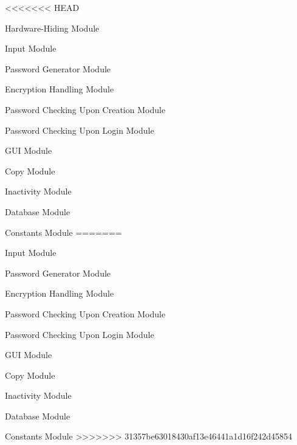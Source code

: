 \documentclass[12pt, titlepage]{article}
\newcounter{mnum}
\newcommand{\mthemnum}{M\themnum}
\begin{document}
\begin{description}
<<<<<<< HEAD
\item [\refstepcounter{mnum} \mthemnum \label{mHH}:] Hardware-Hiding Module  
\item [\refstepcounter{mnum} \mthemnum \label{mIn}:] Input Module
\item [\refstepcounter{mnum} \mthemnum \label{mPG}:] Password Generator Module
\item [\refstepcounter{mnum} \mthemnum \label{mEH}:] Encryption Handling Module
\item [\refstepcounter{mnum} \mthemnum \label{mPCUC}:] Password Checking Upon Creation Module
\item [\refstepcounter{mnum} \mthemnum \label{mPCUL}:] Password Checking Upon Login Module
\item [\refstepcounter{mnum} \mthemnum \label{mGUI}:] GUI Module
\item [\refstepcounter{mnum} \mthemnum \label{mCop}:] Copy Module
\item [\refstepcounter{mnum} \mthemnum \label{mInac}:] Inactivity Module
\item [\refstepcounter{mnum} \mthemnum \label{mDB}:] Database Module
\item [\refstepcounter{mnum} \mthemnum \label{mCons}:] Constants Module
=======
  \item [\refstepcounter{mnum} \mthemnum \label{mIn}:] Input Module
  \item [\refstepcounter{mnum} \mthemnum \label{mPG}:] Password Generator Module
  \item [\refstepcounter{mnum} \mthemnum \label{mEH}:] Encryption Handling Module
  \item [\refstepcounter{mnum} \mthemnum \label{mPCUC}:] Password Checking Upon Creation Module
  \item [\refstepcounter{mnum} \mthemnum \label{mPCUL}:] Password Checking Upon Login Module
  \item [\refstepcounter{mnum} \mthemnum \label{mGUI}:] GUI Module
  \item [\refstepcounter{mnum} \mthemnum \label{mCop}:] Copy Module
  \item [\refstepcounter{mnum} \mthemnum \label{mInac}:] Inactivity Module
  \item [\refstepcounter{mnum} \mthemnum \label{mDB}:] Database Module
  \item [\refstepcounter{mnum} \mthemnum \label{mCons}:] Constants Module
>>>>>>> 31357be63018430af13e46441a1d16f242d45854
\end{description}
\end{document}
